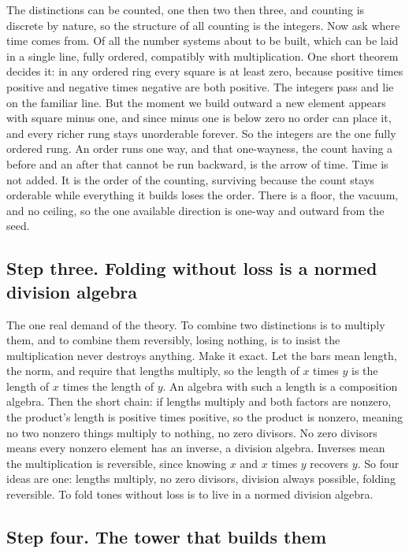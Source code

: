 The distinctions can be counted, one then two then three, and counting is discrete by nature, so the structure of all counting is the integers. Now ask where time comes from. Of all the number systems about to be built, which can be laid in a single line, fully ordered, compatibly with multiplication. One short theorem decides it: in any ordered ring every square is at least zero, because positive times positive and negative times negative are both positive. The integers pass and lie on the familiar line. But the moment we build outward a new element appears with square minus one, and since minus one is below zero no order can place it, and every richer rung stays unorderable forever. So the integers are the one fully ordered rung. An order runs one way, and that one-wayness, the count having a before and an after that cannot be run backward, is the arrow of time. Time is not added. It is the order of the counting, surviving because the count stays orderable while everything it builds loses the order. There is a floor, the vacuum, and no ceiling, so the one available direction is one-way and outward from the seed.

\subsection*{Step three. Folding without loss is a normed division algebra}

The one real demand of the theory. To combine two distinctions is to multiply them, and to combine them reversibly, losing nothing, is to insist the multiplication never destroys anything. Make it exact. Let the bars mean length, the norm, and require that lengths multiply, so the length of $x$ times $y$ is the length of $x$ times the length of $y$. An algebra with such a length is a composition algebra. Then the short chain: if lengths multiply and both factors are nonzero, the product's length is positive times positive, so the product is nonzero, meaning no two nonzero things multiply to nothing, no zero divisors. No zero divisors means every nonzero element has an inverse, a division algebra. Inverses mean the multiplication is reversible, since knowing $x$ and $x$ times $y$ recovers $y$. So four ideas are one: lengths multiply, no zero divisors, division always possible, folding reversible. To fold tones without loss is to live in a normed division algebra.

\subsection*{Step four. The tower that builds them}

